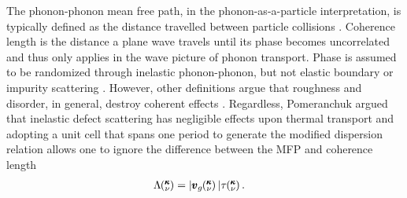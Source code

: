 \documentclass[aps,prb,preprint,preprintnumbers,amsmath,amssymb,floatfix,superscriptaddress]{revtex4}
\newcommand{\kv}{\mspace{-4.0mu}\left(\mspace{-8.0mu}
\begin{smallmatrix}&\pmb{\kappa} \\&\nu\end{smallmatrix}
\mspace{-3.0mu}\right)}
\begin{document}
The phonon-phonon mean free path, in the phonon-as-a-particle interpretation, is typically defined as the distance travelled between particle collisions \cite{ziman_electrons_2001}. Coherence length is the distance a plane wave travels until its phase becomes uncorrelated and thus only applies in the wave picture of phonon transport. Phase is assumed to be randomized through inelastic phonon-phonon, but not elastic boundary or impurity scattering \cite{chen2005nanoscale}. However, other definitions argue that roughness and disorder, in general, destroy coherent effects \cite{PhysRevB.67.195311,dames_682}. Regardless, Pomeranchuk argued that inelastic defect scattering has negligible effects upon thermal transport \cite{pomeranchuk1942thermal} and adopting a unit cell that spans one period to generate the modified dispersion relation allows one to ignore the difference between the MFP and coherence length \cite{PhysRevB.67.195311}
\begin{equation}\label{EQ:M:phonon_mfp}
\begin{split}
\Lambda\kv &= |\pmb{v}_{g}\kv {}| \tau\kv.
\end{split}
\end{equation}
\end{document}
